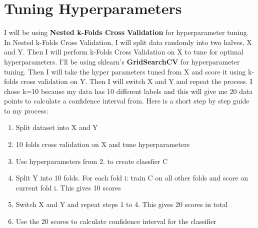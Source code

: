 \documentclass[12pt]{article}
\begin{document}
\section{Tuning Hyperparameters}
I will be using \textbf{Nested k-Folds Cross Validation} for hyperparameter tuning. In Nested k-Folds Cross Validation, I will split data randomly into two halves, X and Y. Then I will perform k-Folds Cross Validation on X to tune for optimal hyperparameters. I'll be using sklearn's \textbf{GridSearchCV} for hyperparameter tuning. Then I will take the hyper parameters tuned from X and score it using k-folds cross validation on Y. Then I will switch X and Y and repeat the process. I chose k=10 because my data has 10 different labels and this will give me 20 data points to calculate a confidence interval from. Here is a short step by step guide to my process:
\begin{enumerate}
    \item Split dataset into X and Y
    \item 10 folds cross validation on X and tune hyperparameters
    \item Use hyperparameters from 2. to create classfier C
    \item Split Y into 10 folds. For each fold i: train C on all other folds and score on current fold i. This gives 10 scores
    \item Switch X and Y and repeat steps 1 to 4. This gives 20 scores in total
    \item Use the 20 scores to calculate confidence interval for the classifier
\end{enumerate}
\end{document}
